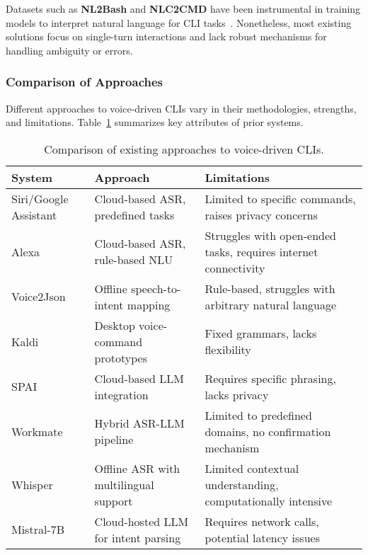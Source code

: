 \documentclass[a4paper,12pt]{article}
\begin{document}
Datasets such as \textbf{NL2Bash} and \textbf{NLC2CMD} have been instrumental in training models to interpret natural language for CLI tasks~\cite{ref26,ref27}. Nonetheless, most existing solutions focus on single-turn interactions and lack robust mechanisms for handling ambiguity or errors.

\subsubsection{Comparison of Approaches}
Different approaches to voice-driven CLIs vary in their methodologies, strengths, and limitations. Table~\ref{tab:relatedwork} summarizes key attributes of prior systems.

\begin{table}[h]
    \centering
    \begin{tabular}{|p{3.5cm}|p{4cm}|p{4cm}|}
        \hline
        \textbf{System} & \textbf{Approach} & \textbf{Limitations} \\ \hline
        Siri/Google Assistant & Cloud-based ASR, predefined tasks & Limited to specific commands, raises privacy concerns~\cite{ref7} \\ \hline
        Alexa & Cloud-based ASR, rule-based NLU & Struggles with open-ended tasks, requires internet connectivity~\cite{ref7} \\ \hline
        Voice2Json & Offline speech-to-intent mapping & Rule-based, struggles with arbitrary natural language~\cite{ref5} \\ \hline
        Kaldi & Desktop voice-command prototypes & Fixed grammars, lacks flexibility~\cite{ref5} \\ \hline
        SPAI & Cloud-based LLM integration & Requires specific phrasing, lacks privacy~\cite{ref9} \\ \hline
        Workmate & Hybrid ASR-LLM pipeline & Limited to predefined domains, no confirmation mechanism~\cite{ref9} \\ \hline
        Whisper & Offline ASR with multilingual support & Limited contextual understanding, computationally intensive~\cite{ref10} \\ \hline
        Mistral-7B & Cloud-hosted LLM for intent parsing & Requires network calls, potential latency issues~\cite{ref11} \\ \hline
    \end{tabular}
    \caption{Comparison of existing approaches to voice-driven CLIs.}
    \label{tab:relatedwork}
\end{table}
\end{document}
